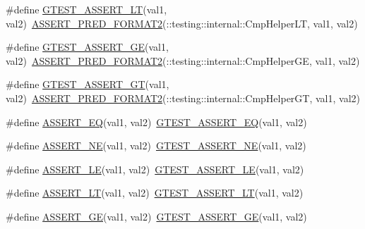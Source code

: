 \begin{DoxyCompactItemize}
\item 
\#define \hyperlink{fused-src_2gtest_2gtest_8h_a5a75667e637febd18e5f7d4f3abf55e8}{G\-T\-E\-S\-T\-\_\-\-A\-S\-S\-E\-R\-T\-\_\-\-L\-T}(val1, val2)~\hyperlink{gtest__pred__impl_8h_ac452685a1a98ea3d96eb956a062ee210}{A\-S\-S\-E\-R\-T\-\_\-\-P\-R\-E\-D\-\_\-\-F\-O\-R\-M\-A\-T2}(\-::testing\-::internal\-::\-Cmp\-Helper\-L\-T, val1, val2)
\item 
\#define \hyperlink{fused-src_2gtest_2gtest_8h_a55373d99c079ff1b894e2eb5bcd15c5a}{G\-T\-E\-S\-T\-\_\-\-A\-S\-S\-E\-R\-T\-\_\-\-G\-E}(val1, val2)~\hyperlink{gtest__pred__impl_8h_ac452685a1a98ea3d96eb956a062ee210}{A\-S\-S\-E\-R\-T\-\_\-\-P\-R\-E\-D\-\_\-\-F\-O\-R\-M\-A\-T2}(\-::testing\-::internal\-::\-Cmp\-Helper\-G\-E, val1, val2)
\item 
\#define \hyperlink{fused-src_2gtest_2gtest_8h_a088b9056fd1c1f316b41c22f64deb33a}{G\-T\-E\-S\-T\-\_\-\-A\-S\-S\-E\-R\-T\-\_\-\-G\-T}(val1, val2)~\hyperlink{gtest__pred__impl_8h_ac452685a1a98ea3d96eb956a062ee210}{A\-S\-S\-E\-R\-T\-\_\-\-P\-R\-E\-D\-\_\-\-F\-O\-R\-M\-A\-T2}(\-::testing\-::internal\-::\-Cmp\-Helper\-G\-T, val1, val2)
\item 
\#define \hyperlink{fused-src_2gtest_2gtest_8h_a1a6db8b1338ee7040329322b77779086}{A\-S\-S\-E\-R\-T\-\_\-\-E\-Q}(val1, val2)~\hyperlink{include_2gtest_2gtest_8h_ab49d537c37c637256307f8d55154050c}{G\-T\-E\-S\-T\-\_\-\-A\-S\-S\-E\-R\-T\-\_\-\-E\-Q}(val1, val2)
\item 
\#define \hyperlink{fused-src_2gtest_2gtest_8h_aa866c8dece57912e6f51495ed3e8d8d5}{A\-S\-S\-E\-R\-T\-\_\-\-N\-E}(val1, val2)~\hyperlink{include_2gtest_2gtest_8h_a6fa9bb2b6731eba8f481e40e9e4931b3}{G\-T\-E\-S\-T\-\_\-\-A\-S\-S\-E\-R\-T\-\_\-\-N\-E}(val1, val2)
\item 
\#define \hyperlink{fused-src_2gtest_2gtest_8h_a775643748feff0b490aae651d041e971}{A\-S\-S\-E\-R\-T\-\_\-\-L\-E}(val1, val2)~\hyperlink{include_2gtest_2gtest_8h_abef04dcd4a0259d378de7b3b3ffb6730}{G\-T\-E\-S\-T\-\_\-\-A\-S\-S\-E\-R\-T\-\_\-\-L\-E}(val1, val2)
\item 
\#define \hyperlink{fused-src_2gtest_2gtest_8h_affc4f9cae4c3aabfe60fced83737b42c}{A\-S\-S\-E\-R\-T\-\_\-\-L\-T}(val1, val2)~\hyperlink{include_2gtest_2gtest_8h_a5a75667e637febd18e5f7d4f3abf55e8}{G\-T\-E\-S\-T\-\_\-\-A\-S\-S\-E\-R\-T\-\_\-\-L\-T}(val1, val2)
\item 
\#define \hyperlink{fused-src_2gtest_2gtest_8h_af4ff5dc71479fcb374b6bc2ed195bcc4}{A\-S\-S\-E\-R\-T\-\_\-\-G\-E}(val1, val2)~\hyperlink{include_2gtest_2gtest_8h_a55373d99c079ff1b894e2eb5bcd15c5a}{G\-T\-E\-S\-T\-\_\-\-A\-S\-S\-E\-R\-T\-\_\-\-G\-E}(val1, val2)

\end{DoxyCompactItemize}

